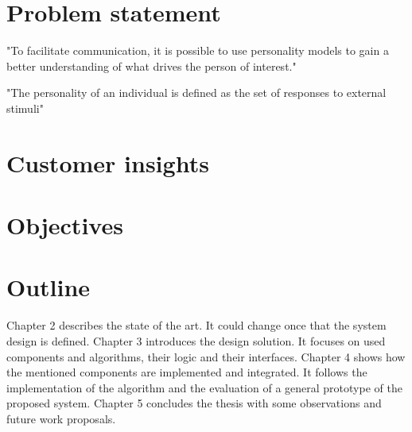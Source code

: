 \section{Problem statement}
"To facilitate communication, it is possible to use personality models to gain a better understanding of what drives the person of interest."

"The personality of an individual is defined as the set of responses to external stimuli"
\section{Customer insights}
\section{Objectives}
\section{Outline}

Chapter 2 describes the state of the art. It could change once that the system design is defined. Chapter 3 introduces the design solution. It focuses on used components and algorithms, their logic and their interfaces. Chapter 4 shows how the mentioned components are implemented and integrated. It follows the implementation of the algorithm and the evaluation of a general prototype of the proposed system. Chapter 5 concludes the thesis with some observations and future work proposals.